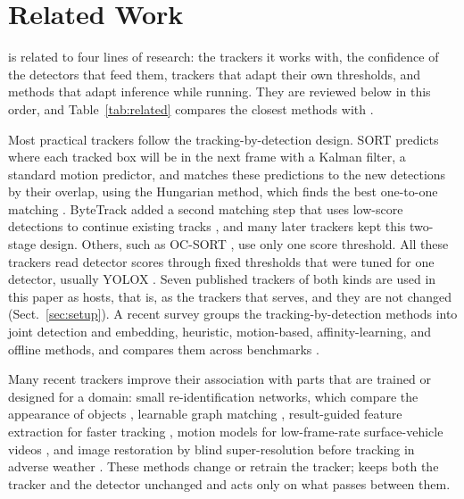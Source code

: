 \section{Related Work}\label{sec:related}

\scl{} is related to four lines of research: the trackers it works with, the
confidence of the detectors that feed them, trackers that adapt their own
thresholds, and methods that adapt inference while running. They are
reviewed below in this order, and Table~\ref{tab:related} compares the
closest methods with \scl{}.

Most practical trackers follow the tracking-by-detection design. SORT
predicts where each tracked box will be in the next frame with a Kalman
filter, a standard motion predictor, and matches these predictions to the new
detections by their overlap, using the Hungarian method, which finds the best
one-to-one matching \cite{bewley2016sort}.
ByteTrack added a second matching step that uses low-score detections to
continue existing tracks \cite{zhang2022bytetrack}, and many later trackers
kept this two-stage design. Others, such as OC-SORT \cite{cao2023ocsort}, use
only one score threshold. All these trackers read detector scores through
fixed thresholds that were tuned for one detector, usually YOLOX
\cite{ge2021yolox}. Seven published trackers of both kinds are used in this
paper as hosts, that is, as the trackers that \scl{} serves, and they are not
changed (Sect.~\ref{sec:setup}). A recent survey
groups the tracking-by-detection methods into joint detection and embedding,
heuristic, motion-based, affinity-learning, and offline methods, and compares
them across benchmarks \cite{adzemovic2026survey}.

Many recent trackers improve their association with parts that are trained or
designed for a domain: small re-identification networks, which compare the
appearance of objects \cite{li2024fdbtrack}, learnable graph matching
\cite{bao2024graphmatching,zhang2025sinkhorn}, result-guided feature
extraction for faster tracking \cite{ding2025remot}, motion models for
low-frame-rate surface-vehicle videos \cite{liang2024motiontrack}, and image
restoration by blind super-resolution before tracking in adverse weather
\cite{sun2026bsr}. These methods change or retrain the tracker; \scl{} keeps
both the tracker and the detector unchanged and acts only on what passes
between them.

